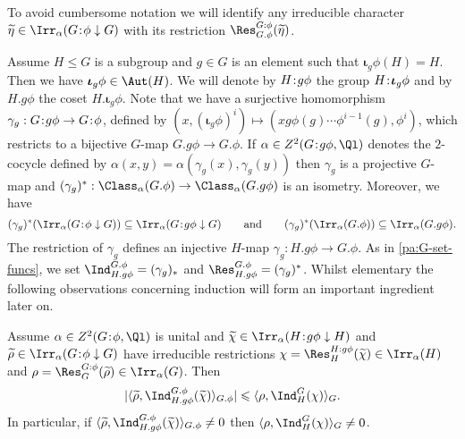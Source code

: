 \documentclass[eqthmnum,nocolour,skinny]{jt-calcs}
\newcommand\sd{
	\mathchoice{\mkern1.5mu}{\mkern1.5mu}{}{}%
	{:}%
	\mathchoice{\mkern1.5mu}{\mkern1.5mu}{}{}
}
\begin{document}
\begin{rem}
To avoid cumbersome notation we will identify any irreducible character $\widetilde{\eta} \in \Irr_{\alpha}(G\sd\phi \downarrow G)$ with its restriction $\Res_{G.\phi}^{G\sd\phi}(\widetilde{\eta})$.
\end{rem}

\begin{pa}
Assume $H \leqslant G$ is a subgroup and $g \in G$ is an element such that $\boldsymbol{\iota}_g\phi(H) = H$. Then we have $\boldsymbol{\iota}_g\phi \in \Aut(H)$. We will denote by $H\sd g\phi$ the group $H\sd\boldsymbol{\iota}_g\phi$ and by $H.g\phi$ the coset $H.\boldsymbol{\iota}_g\phi$. Note that we have a surjective homomorphism $\gamma_g : G\sd g\phi \to G\sd \phi$, defined by $(x,(\boldsymbol{\iota}_g\phi)^i) \mapsto (xg\phi(g)\cdots\phi^{i-1}(g),\phi^i)$, which restricts to a bijective $G$-map $G.g\phi \to G.\phi$. If $\alpha \in Z^2(G\sd g\phi,\Ql)$ denotes the $2$-cocycle defined by $\alpha(x,y) = \alpha(\gamma_g(x),\gamma_g(y))$ then $\gamma_g$ is a projective $G$-map and $(\gamma_g)^* : \Class_{\alpha}(G.\phi) \to \Class_{\alpha}(G.g\phi)$ is an isometry. Moreover, we have
\begin{equation*}
(\gamma_g)^*(\Irr_{\alpha}(G\sd\phi\downarrow G)) \subseteq \Irr_{\alpha}(G\sd g\phi\downarrow G) \qquad\text{and} \qquad (\gamma_g)^*(\Irr_{\alpha}(G.\phi)) \subseteq \Irr_{\alpha}(G.g\phi).
\end{equation*}
The restriction of $\gamma_g$ defines an injective $H$-map $\gamma_g : H.g\phi \to G.\phi$. As in \cref{pa:G-set-funcs}, we set $\Ind_{H.g\phi}^{G.\phi} = (\gamma_g)_*$ and $\Res_{H.g\phi}^{G.\phi} = (\gamma_g)^*$. Whilst elementary the following observations concerning induction will form an important ingredient later on.
\end{pa}

\begin{lem}\label{lem:coset-ind-reg-ind}
Assume $\alpha \in Z^2(G\sd\phi,\Ql)$ is unital and $\widetilde{\chi} \in \Irr_{\alpha}(H\sd g\phi \downarrow H)$ and $\widetilde{\rho} \in \Irr_{\alpha}(G\sd\phi\downarrow G)$ have irreducible restrictions $\chi = \Res_H^{H\sd g\phi}(\widetilde{\chi}) \in \Irr_{\alpha}(H)$ and $\rho = \Res_G^{G\sd\phi}(\widetilde{\rho}) \in \Irr_{\alpha}(G)$. Then
\begin{equation*}
|\langle \widetilde{\rho},\Ind_{H.g\phi}^{G.\phi}(\widetilde{\chi})\rangle_{G.\phi}| \leqslant \langle \rho,\Ind_H^G(\chi) \rangle_G.
\end{equation*}
In particular, if $\langle \widetilde{\rho},\Ind_{H.g\phi}^{G.\phi}(\widetilde{\chi})\rangle_{G.\phi} \neq 0$ then $\langle \rho,\Ind_H^G(\chi)\rangle_G \neq 0$.
\end{lem}
\end{document}
